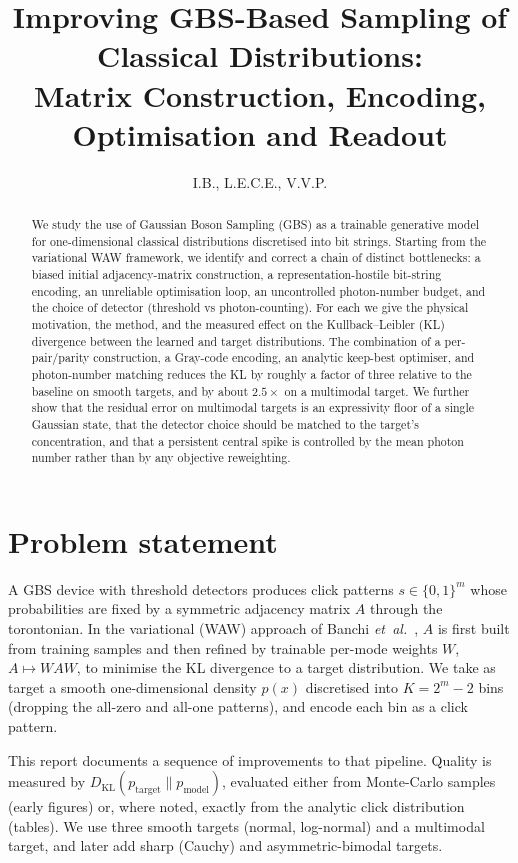 \documentclass[11pt,a4paper]{article}
\title{Improving GBS-Based Sampling of Classical Distributions:\\
Matrix Construction, Encoding, Optimisation and Readout}
\author{I.B., L.E.C.E., V.V.P.}
\date{}
\begin{document}
\maketitle

\begin{abstract}
We study the use of Gaussian Boson Sampling (GBS) as a trainable generative
model for one-dimensional classical distributions discretised into bit strings.
Starting from the variational WAW framework, we identify and correct a chain of
distinct bottlenecks: a biased initial adjacency-matrix construction, a
representation-hostile bit-string encoding, an unreliable optimisation loop, an
uncontrolled photon-number budget, and the choice of detector (threshold vs
photon-counting). For each we give the physical motivation, the method, and the
measured effect on the Kullback--Leibler (KL) divergence between the learned and
target distributions. The combination of a per-pair/parity construction, a
Gray-code encoding, an analytic keep-best optimiser, and photon-number matching
reduces the KL by roughly a factor of three relative to the baseline on smooth
targets, and by about $2.5\times$ on a multimodal target. We further show that
the residual error on multimodal targets is an expressivity floor of a single
Gaussian state, that the detector choice should be matched to the target's
concentration, and that a persistent central spike is controlled by the mean
photon number rather than by any objective reweighting.
\end{abstract}

\tableofcontents

\section{Problem statement}

A GBS device with threshold detectors produces click patterns $s\in\{0,1\}^m$
whose probabilities are fixed by a symmetric adjacency matrix $A$ through the
torontonian. In the variational (WAW) approach of Banchi
\textit{et~al.}~\cite{banchi2020}, $A$ is first built from training samples and
then refined by trainable per-mode weights $W$, $A\mapsto WAW$, to minimise the
KL divergence to a target distribution. We take as target a smooth
one-dimensional density $p(x)$ discretised into $K=2^{m}-2$ bins (dropping the
all-zero and all-one patterns), and encode each bin as a click pattern.

This report documents a sequence of improvements to that pipeline. Quality is
measured by $D_{\mathrm{KL}}(p_{\mathrm{target}}\|p_{\mathrm{model}})$, evaluated
either from Monte-Carlo samples (early figures) or, where noted, exactly from
the analytic click distribution (tables). We use three smooth targets (normal,
log-normal) and a multimodal target, and later add sharp (Cauchy) and
asymmetric-bimodal targets.
\end{document}
